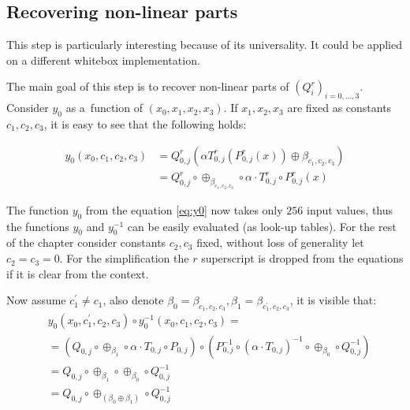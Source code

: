 \documentclass[11pt,oneside,final]{fithesis2}
\begin{document}
    \subsection{Recovering non-linear parts}
    This step is particularly interesting because of its universality. It could be applied on a different whitebox implementation.
    
    The main goal of this step is to recover non-linear parts of $\left(Q^r_i\right)_{i=0,\dots,3}$. Consider $y_0$ as a~function of $\left(x_0, x_1, x_2, x_3\right)$.
    If $x_1, x_2, x_3$ are fixed as constants $c_1, c_2, c_3$, it is easy to see that the following holds:
    
    \begin{equation} \label{eq:y0}    
    \begin{aligned}
    y_0\left(x_0, c_1, c_2, c_3 \right) &= Q^r_{0,j} \left(\alpha T^r_{0,j}\left(P^r_{0,j}\left(x\right)\right) \oplus \beta_{c_1,c_2,c_3}\right) \\
				        &= Q^r_{0,j} \circ \oplus_{\beta_{c_1,c_2,c_3}} \circ \alpha \cdot T^r_{0,j} \circ P^r_{0,j} \left(x\right)
    \end{aligned}
    \end{equation}
    
    The function $y_0$ from the equation \ref{eq:y0} now takes only $256$ input values, thus the functions $y_0$ and $y_0^{-1}$ 
    can be easily evaluated (as look-up tables). For the rest of the chapter consider constants $c_2, c_3$ fixed, without loss 
    of generality let $c_2=c_3=0$. For the simplification the $r$ superscript is dropped from the 
    equations if it is clear from the context.

    Now assume $c^{\prime}_1 \neq c_1$, also denote $\beta_{0} = \beta_{c_1,c_2,c_3}, \beta_{1} = \beta_{c^{\prime}_1,c_2,c_3}$, it is visible that:
    \begin{subequations}
     \begin{align}
     & y_0\left(x_0, c^{\prime}_1, c_2, c_3 \right) \circ y_0^{-1}\left(x_0, c_1, c_2, c_3 \right) = \nonumber \\
     &=           \left( Q_{0,j}      \circ \oplus_{\beta_1}                         \circ \alpha \cdot T_{0,j}    \circ P_{0,j}     \right) \nonumber
	\circ     \left( P^{-1}_{0,j} \circ \left(\alpha \cdot T_{0,j}\right)^{-1}   \circ \oplus_{\beta_0}        \circ Q^{-1}_{0,j}\right) \nonumber \\
     &= Q_{0,j} \circ \oplus_{\beta_1} \circ \oplus_{\beta_0} \circ Q^{-1}_{0,j}                                                             \nonumber \\
     &= Q_{0,j} \circ \oplus_{\left(\beta_0 \oplus \beta_1\right)} \circ Q^{-1}_{0,j}                                                        \nonumber
     \end{align}
    \end{subequations}
\end{document}
